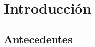 
\cleardoublepage


\chapter{Introducción}
\label{makereference}




\section{Antecedentes}
\label{makereference1.1}

